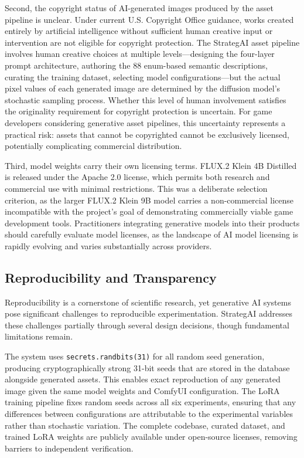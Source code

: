 \documentclass[conference]{IEEEtran}
\begin{document}
Second, the copyright status of AI-generated images produced by the asset pipeline is unclear. Under current U.S. Copyright Office guidance, works created entirely by artificial intelligence without sufficient human creative input or intervention are not eligible for copyright protection. The StrategAI asset pipeline involves human creative choices at multiple levels---designing the four-layer prompt architecture, authoring the 88 enum-based semantic descriptions, curating the training dataset, selecting model configurations---but the actual pixel values of each generated image are determined by the diffusion model's stochastic sampling process. Whether this level of human involvement satisfies the originality requirement for copyright protection is uncertain. For game developers considering generative asset pipelines, this uncertainty represents a practical risk: assets that cannot be copyrighted cannot be exclusively licensed, potentially complicating commercial distribution.

Third, model weights carry their own licensing terms. FLUX.2 Klein 4B Distilled is released under the Apache 2.0 license, which permits both research and commercial use with minimal restrictions. This was a deliberate selection criterion, as the larger FLUX.2 Klein 9B model carries a non-commercial license incompatible with the project's goal of demonstrating commercially viable game development tools. Practitioners integrating generative models into their products should carefully evaluate model licenses, as the landscape of AI model licensing is rapidly evolving and varies substantially across providers.

\subsection{Reproducibility and Transparency}

Reproducibility is a cornerstone of scientific research, yet generative AI systems pose significant challenges to reproducible experimentation. StrategAI addresses these challenges partially through several design decisions, though fundamental limitations remain.

The system uses \texttt{secrets.randbits(31)} for all random seed generation, producing cryptographically strong 31-bit seeds that are stored in the database alongside generated assets. This enables exact reproduction of any generated image given the same model weights and ComfyUI configuration. The LoRA training pipeline fixes random seeds across all six experiments, ensuring that any differences between configurations are attributable to the experimental variables rather than stochastic variation. The complete codebase, curated dataset, and trained LoRA weights are publicly available under open-source licenses, removing barriers to independent verification.
\end{document}

